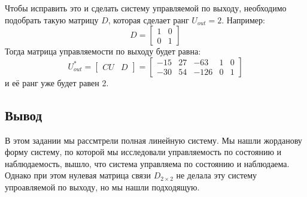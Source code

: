 Чтобы исправить это и сделать систему управляемой по выходу, необходимо подобрать такую матрицу $D$, которая сделает ранг $U_{out}=2$. 
Например: 
$$
    D = \begin{bmatrix}
        1 & 0 \\
        0 & 1
    \end{bmatrix}
$$
Тогда матрица управляемости по выходу будет равна:
$$
    U^*_{out} = \begin{bmatrix}
      CU & D
    \end{bmatrix} =  \begin{bmatrix}
      -15 & 27 & -63 & 1 & 0 \\
      -30 & 54 & -126 & 0 & 1 
    \end{bmatrix}
$$
и её ранг уже будет равен 2.

\subsection{Вывод}

В этом задании мы рассмтрели полная линейную систему. Мы нашли жорданову форму систему, по которой мы исследовали управляемость по состоянию и наблюдаемость, 
вышло, что система управляема по состоянию и наблюдаема. Однако при этом нулевая матрица связи $D_{2×2}$ не делала эту систему упроавляемой по выходу, но
мы нашли подходящую.
\endinput